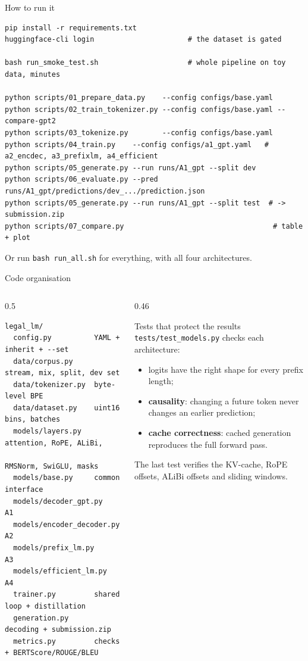\documentclass[aspectratio=169,11pt]{beamer}
\newcommand{\code}[1]{\texttt{\small #1}}
\begin{document}
\begin{frame}[fragile]{How to run it}
  \scriptsize
\begin{verbatim}
pip install -r requirements.txt
huggingface-cli login                      # the dataset is gated

bash run_smoke_test.sh                     # whole pipeline on toy data, minutes

python scripts/01_prepare_data.py    --config configs/base.yaml
python scripts/02_train_tokenizer.py --config configs/base.yaml --compare-gpt2
python scripts/03_tokenize.py        --config configs/base.yaml
python scripts/04_train.py    --config configs/a1_gpt.yaml   # a2_encdec, a3_prefixlm, a4_efficient
python scripts/05_generate.py --run runs/A1_gpt --split dev
python scripts/06_evaluate.py --pred runs/A1_gpt/predictions/dev_.../prediction.json
python scripts/05_generate.py --run runs/A1_gpt --split test  # -> submission.zip
python scripts/07_compare.py                                   # table + plot
\end{verbatim}
  Or run \code{bash run\_all.sh} for everything, with all four architectures.
\end{frame}

\begin{frame}[fragile]{Code organisation}
  \begin{columns}[T]
    \begin{column}{0.5\textwidth}
      \scriptsize
\begin{verbatim}
legal_lm/
  config.py          YAML + inherit + --set
  data/corpus.py     stream, mix, split, dev set
  data/tokenizer.py  byte-level BPE
  data/dataset.py    uint16 bins, batches
  models/layers.py   attention, RoPE, ALiBi,
                     RMSNorm, SwiGLU, masks
  models/base.py     common interface
  models/decoder_gpt.py      A1
  models/encoder_decoder.py  A2
  models/prefix_lm.py        A3
  models/efficient_lm.py     A4
  trainer.py         shared loop + distillation
  generation.py      decoding + submission.zip
  metrics.py         checks + BERTScore/ROUGE/BLEU
\end{verbatim}
    \end{column}
    \begin{column}{0.46\textwidth}
      \begin{block}{Tests that protect the results}
        \small
        \code{tests/test\_models.py} checks each architecture:
        \begin{itemize}
          \item logits have the right shape for every prefix length;
          \item \textbf{causality}: changing a future token never changes an earlier prediction;
          \item \textbf{cache correctness}: cached generation reproduces the full forward pass.
        \end{itemize}
        The last test verifies the KV-cache, RoPE offsets, ALiBi offsets and sliding windows.
      \end{block}
    \end{column}
  \end{columns}
\end{frame}
\end{document}
